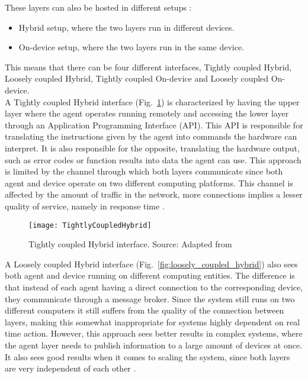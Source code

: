 These layers can also be hosted in different setups \cite{8591641}:
\begin{itemize}
	\item Hybrid setup, where the two layers run in different devices.
	\item On-device setup, where the two layers run in the same device. 
\end{itemize}

This means that there can be four different interfaces, Tightly coupled Hybrid, Loosely coupled Hybrid, Tightly coupled On-device and Loosely coupled On-device.\\

A Tightly coupled Hybrid interface (Fig.~\ref{fig:tightly_coupled_hybrid}) is characterized by having the upper layer where the agent operates running remotely and accessing the lower layer through an Application Programming Interface (API). This API is responsible for translating the instructions given by the agent into commands the hardware can interpret. It is also responsible for the opposite, translating the hardware output, such as error codes or function results into data the agent can use. This approach is limited by the channel through which both layers communicate since both agent and device operate on two different computing platforms. This channel is affected by the amount of traffic in the network, more connections implies a lesser quality of service, namely in response time \cite{8591641}.\\

\begin{figure}[hbt!]
	\centering
	\texttt{[image: TightlyCoupledHybrid]}
	\caption{Tightly coupled Hybrid interface. Source: Adapted from \cite{8591641}}
	\label{fig:tightly_coupled_hybrid}
\end{figure}

A Loosely coupled Hybrid interface (Fig.~\ref{fig:loosely_coupled_hybrid}) also sees both agent and device running on different computing entities. The difference is that instead of each agent having a direct connection to the corresponding device, they communicate through a message broker. Since the system still runs on two different computers it still suffers from the quality of the connection between layers, making this somewhat inappropriate for systems highly dependent on real time action. However, this approach sees better results in complex systems, where the agent layer needs to publish information to a large amount of devices at once. It also sees good results when it comes to scaling the system, since both layers are very independent of each other \cite{8591641}.\\

